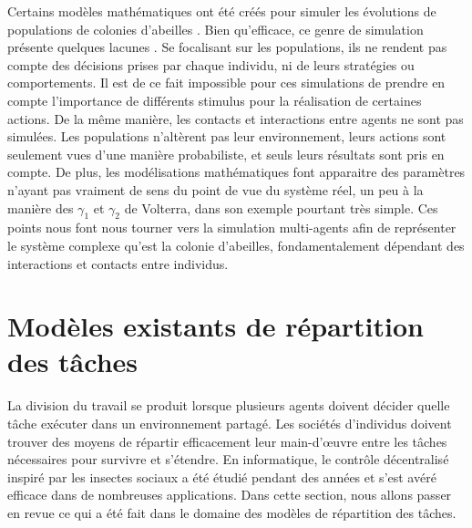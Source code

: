 		Certains modèles mathématiques ont été créés pour simuler les évolutions de populations de colonies d'abeilles \cite{schmickl_hopomo_2007}. Bien qu'efficace, ce genre de simulation présente quelques lacunes \cite{drogoul_multi-agent_1992}. Se focalisant sur les populations, ils ne rendent pas compte des décisions prises par chaque individu, ni de leurs stratégies ou comportements. Il est de ce fait impossible pour ces simulations de prendre en compte l'importance de différents stimulus pour la réalisation de certaines actions. De la même manière, les contacts et interactions entre agents ne sont pas simulées. Les populations n'altèrent pas leur environnement, leurs actions sont seulement vues d'une manière probabiliste, et seuls leurs résultats sont pris en compte. De plus, les modélisations mathématiques font apparaitre des paramètres n'ayant pas vraiment de sens du point de vue du système réel, un peu à la manière des $\gamma_1$ et $\gamma_2$ de Volterra, dans son exemple pourtant très simple. Ces points nous font nous tourner vers la simulation multi-agents afin de représenter le système complexe qu'est la colonie d'abeilles, fondamentalement dépendant des interactions et contacts entre individus.
			
			
	\section{Modèles existants de répartition des tâches}
	La division du travail se produit lorsque plusieurs agents doivent décider quelle tâche exécuter dans un environnement partagé. Les sociétés d'individus doivent trouver des moyens de répartir efficacement leur main-d'œuvre entre les tâches nécessaires pour survivre et s'étendre. En informatique, le contrôle décentralisé inspiré par les insectes sociaux a été étudié pendant des années et s'est avéré efficace dans de nombreuses applications. Dans cette section, nous allons passer en revue ce qui a été fait dans le domaine des modèles de répartition des tâches.
	
	
